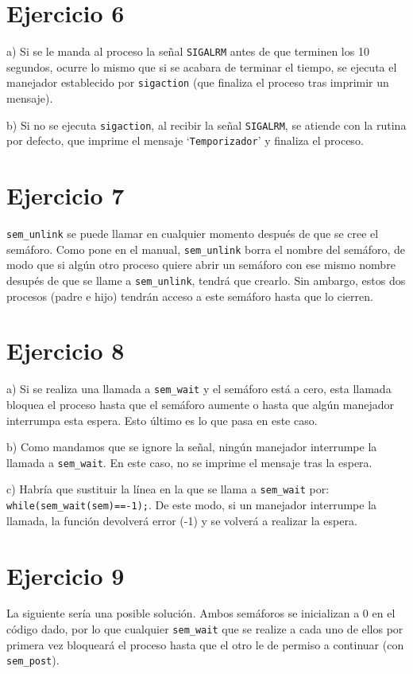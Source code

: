 \documentclass{article}
\begin{document}
\section*{Ejercicio 6}
a) Si se le manda al proceso la señal \texttt{SIGALRM} antes de que terminen los 10 segundos, ocurre lo mismo que si se acabara de terminar el tiempo, se ejecuta el manejador establecido por \texttt{sigaction} (que finaliza el proceso tras imprimir un mensaje).

b) Si no se ejecuta \texttt{sigaction}, al recibir la señal \texttt{SIGALRM}, se atiende con la rutina por defecto, que imprime el mensaje `\texttt{Temporizador}' y finaliza el proceso.

\section*{Ejercicio 7}
\texttt{sem\_unlink} se puede llamar en cualquier momento después de que se cree el semáforo. Como pone en el manual, \texttt{sem\_unlink} borra el nombre del semáforo, de modo que si algún otro proceso quiere abrir un semáforo con ese mismo nombre desupés de que se llame a \texttt{sem\_unlink}, tendrá que crearlo. Sin ambargo, estos dos procesos (padre e hijo) tendrán acceso a este semáforo hasta que lo cierren. 


\section*{Ejercicio 8}
a) Si se realiza una llamada a \texttt{sem\_wait} y el semáforo está a cero, esta llamada bloquea el proceso hasta que el semáforo aumente o hasta que algún manejador interrumpa esta espera. Esto último es lo que pasa en este caso. 

b) Como mandamos que se ignore la señal, ningún manejador interrumpe la llamada a \texttt{sem\_wait}. En este caso, no se imprime el mensaje tras la espera.

c) Habría que sustituir la línea en la que se llama a \texttt{sem\_wait} por: \texttt{while(sem\_wait(sem)==-1);}. De este modo, si un manejador interrumpe la llamada, la función devolverá error (-1) y se volverá a realizar la espera.


\section*{Ejercicio 9}
La siguiente sería una posible solución. Ambos semáforos se inicializan a $0$ en el código dado, por lo que cualquier \texttt{sem\_wait} que se realize a cada uno de ellos por primera vez bloqueará el proceso hasta que el otro le de permiso a continuar (con \texttt{sem\_post}).
\end{document}
